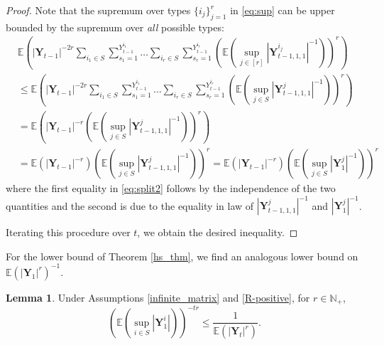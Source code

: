 \documentclass[preprint,3p,12pt]{elsarticle}
\theoremstyle{definition}
\newtheorem{lemma}{Lemma}
\begin{document}
\begin{proof}
Note that the supremum over types $\{i_j\}_{j=1}^r$ in \eqref{eq:sup} can be upper bounded by the supremum over \emph{all} possible types:
\begin{align}
&\mathbb{E}\left(|\boldsymbol{Y}_{t-1}|^{-2r}\sum_{i_1 \in S}\sum_{s_1=1}^{Y_{t-1}^{i_1}} \dots \sum_{i_r \in S}\sum_{s_r=1}^{Y_{t-1}^{i_r}}\left(\mathbb{E}\left(\sup_{j \in [r]}|\boldsymbol{Y}_{t-1,1,1}^{i_j}|^{-1}\right)\right)^r\right) \nonumber\\
    & \le  \mathbb{E}\left(|\boldsymbol{Y}_{t-1}|^{-2r}\sum_{i_1 \in S}\sum_{s_1=1}^{Y_{t-1}^{i_1}} \dots \sum_{i_r \in S}\sum_{s_r=1}^{Y_{t-1}^{i_r}}\left(\mathbb{E}\left(\sup_{j \in S}|\boldsymbol{Y}^j_{t-1, 1, 1}|^{-1}\right)\right)^r\right)  \nonumber \\
    & = \mathbb{E}\left(|\boldsymbol{Y}_{t-1}|^{-r}\left(\mathbb{E}\left(\sup_{j \in S}|\boldsymbol{Y}^j_{t-1, 1, 1}|^{-1}\right)\right)^r\right) \nonumber\\
    & = \mathbb{E}\left(|\boldsymbol{Y}_{t-1}|^{-r}\right)\left(\mathbb{E}\left(\sup_{j \in S}|\boldsymbol{Y}^j_{t-1, 1, 1}|^{-1}\right)\right)^r = \mathbb{E}\left(|\boldsymbol{Y}_{t-1}|^{-r}\right)\left(\mathbb{E}\left(\sup_{j \in S}|\boldsymbol{Y}_1^j|^{-1}\right)\right)^r  \label{eq:split2}%
    \end{align}
where the first equality in \eqref{eq:split2} follows by the independence of the two quantities and the second is due to the equality in law of $|\boldsymbol{Y}^j_{t-1, 1, 1}|^{-1}$ and $|\boldsymbol{Y}_1^j|^{-1}$.

Iterating this procedure over $t$, we obtain the desired inequality. %
\end{proof}
For the lower bound of Theorem \ref{hs_thm}, we find an analogous lower bound on $\mathbb{E}(|\boldsymbol{Y}_1|^r)^{-1}$.
\begin{lemma}\label{y_lower}
Under Assumptions \ref{infinite_matrix} and \ref{R-positive}, for 
$r \in \mathbb{N}_+$, 
\begin{equation*}
    \left(\mathbb{E}\left(\sup_{i \in S}|\boldsymbol{Y}_{1}^i|\right)\right)^{-tr}   \le \frac{1}{\mathbb{E}(|\boldsymbol{Y}_t|^r)}.
    \end{equation*}
\end{lemma}
\end{document}
